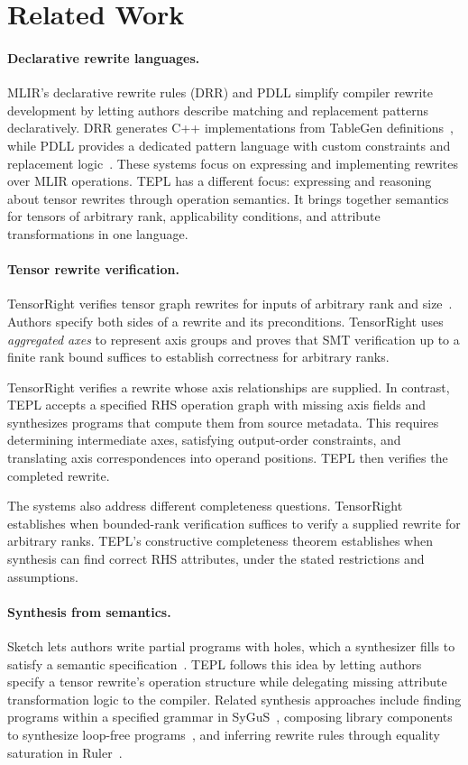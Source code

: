 \section{Related Work}
\label{sec:related-work}

\paragraph{Declarative rewrite languages.}
MLIR's declarative rewrite rules (DRR) and PDLL simplify compiler rewrite
development by letting authors describe matching and replacement patterns
declaratively. DRR generates C++ implementations from TableGen
definitions~\cite{mlir-drr}, while PDLL provides a dedicated pattern language
with custom constraints and replacement logic~\cite{mlir-pdll}. These
systems focus on expressing and implementing rewrites over MLIR operations.
TEPL has a different focus: expressing and reasoning about tensor rewrites
through operation semantics. It brings together semantics for tensors of
arbitrary rank, applicability conditions, and attribute transformations in
one language.

\paragraph{Tensor rewrite verification.}
TensorRight verifies tensor graph rewrites for inputs of arbitrary rank and
size~\cite{tensorright}. Authors specify both sides of a rewrite and its
preconditions. TensorRight uses \emph{aggregated axes} to represent axis
groups and proves that SMT verification up to a finite rank bound suffices
to establish correctness for arbitrary ranks.

TensorRight verifies a rewrite whose axis relationships are supplied.
In contrast, TEPL accepts a specified RHS operation graph with missing
axis fields and synthesizes programs that compute them from source
metadata. This requires determining intermediate axes, satisfying
output-order constraints, and translating axis correspondences into
operand positions. TEPL then verifies the completed rewrite.

The systems also address different completeness questions. TensorRight
establishes when bounded-rank verification suffices to verify a supplied
rewrite for arbitrary ranks. TEPL's constructive completeness theorem
establishes when synthesis can find correct RHS attributes, under the stated
restrictions and assumptions.

\paragraph{Synthesis from semantics.}
Sketch lets authors write partial programs with holes, which a synthesizer
fills to satisfy a semantic specification~\cite{sketch}. TEPL follows this
idea by letting authors specify a tensor rewrite's operation structure while
delegating missing attribute transformation logic to the compiler. Related
synthesis approaches include finding programs within a specified grammar
in SyGuS~\cite{sygus}, composing library components to synthesize loop-free
programs~\cite{loop-free-synthesis}, and inferring rewrite rules through
equality saturation in Ruler~\cite{ruler}.
